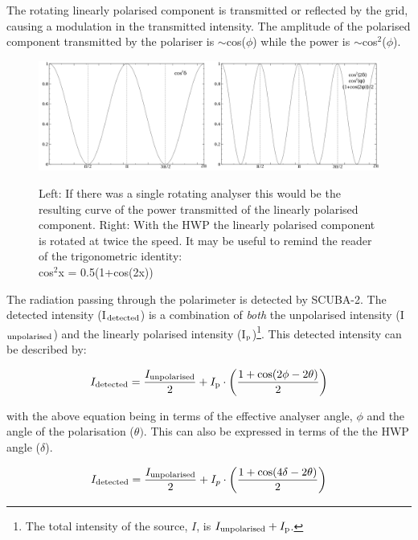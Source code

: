 The rotating linearly polarised component is transmitted or reflected
by the grid, causing a modulation in the transmitted intensity.
The amplitude of the polarised component transmitted by the polariser is
$\sim$cos($\phi$) while the power is $\sim$cos$^{2}$($\phi$).

\begin{figure}[t!]
\begin{center}
\includegraphics[width=0.95\linewidth]{hwp-modulation-basic.png}
\label{fig:hwp-modulation-basic}
\caption [Modulation by the HWP - basic description]{ Left: If there
  was a single rotating analyser this would be the resulting curve of
  the power transmitted of the linearly polarised component.
  Right: With the HWP the linearly polarised component is
  rotated at twice the speed. It may be useful to remind the reader of
  the trigonometric identity: \\ cos$^{2}$x = 0.5(1+cos(2x))}
\end{center}
\end{figure}


The radiation passing through the polarimeter is detected by
SCUBA-2. The detected intensity (I$_{\textnormal{detected}}$) is a combination of
\emph{both} the unpolarised intensity (I$_{\textnormal{unpolarised}}$) and the
linearly polarised intensity (I$_{\textnormal{p}}$)\footnote{The total intensity of
the source, $I$, is $I_{\textnormal{unpolarised}} + I_{\textnormal{p}}$.}. This detected intensity can be
described by:

\begin{equation}
I_{\textnormal{detected}} = \frac{I_{\textnormal{unpolarised}}}{2}+ I_{\textnormal{p}}\cdot\left(\frac{1+\cos(2\phi - 2\theta)}{2} \right)
\end{equation}

with the above equation being in terms of the effective analyser
angle, $\phi$ and the angle of the polarisation ($\theta)$.
This can also be expressed in terms of the  the HWP angle ($\delta$).

\begin{equation}
\label{eqn:idet}
I_{\textnormal{detected}} = \frac{I_{\textnormal{unpolarised}}}{2}+I_{p}\cdot\left(\frac{1+\cos(4\delta - 2\theta)}{2} \right)
\end{equation}





